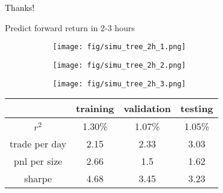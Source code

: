 \documentclass[9pt]{beamer}
\begin{document}
\begin{frame}
\begin{center}
\begin{LARGE}
\textcolor{black}{Thanks!}
\end{LARGE}
\end{center}
\end{frame}




\begin{frame}{Predict forward return in 2-3 hours}


\begin{figure}[h!]
    \centering
    \begin{subfigure}[b]{0.32\textwidth}
        \centering
        \texttt{[image: fig/simu\_tree\_2h\_1.png]}
        \label{fig:figure1}
    \end{subfigure}
    \begin{subfigure}[b]{0.32\textwidth}
        \centering
        \texttt{[image: fig/simu\_tree\_2h\_2.png]}
        \label{fig:figure2}
    \end{subfigure}
    \begin{subfigure}[b]{0.32\textwidth}
        \centering
        \texttt{[image: fig/simu\_tree\_2h\_3.png]}
        \label{fig:figure3}
    \end{subfigure}
    \label{fig:three_figures}
\end{figure}


\begin{table}[h!]
\centering
\begin{tabular}{c|c|c|c}
\hline
 & \textbf{training} & \textbf{validation} & \textbf{testing} \\ \hline
$r^2$      & 1.30\%      & 1.07\%     & 1.05\%      \\ \hline
trade per day      & 2.15      & 2.33      & 3.03      \\ \hline
pnl per size      & 2.66      & 1.5      & 1.62      \\ \hline
sharpe      & 4.68      & 3.45      & 3.23     \\ \hline
\end{tabular}
\end{table}


\end{frame}



%


% 
\end{document}
